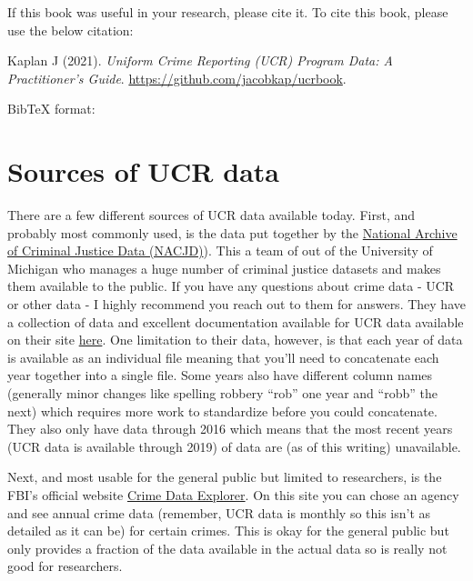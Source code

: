 \documentclass[
  12pt,
  openany]{book}
\begin{document}
If this book was useful in your research, please cite it. To cite this book, please use the below citation:

Kaplan J (2021). \emph{Uniform Crime Reporting (UCR) Program Data: A Practitioner's Guide}. \url{https://github.com/jacobkap/ucrbook}.

BibTeX format:

\hypertarget{sources-of-ucr-data}{%
\section*{Sources of UCR data}\label{sources-of-ucr-data}}


There are a few different sources of UCR data available today. First, and probably most commonly used, is the data put together by the \href{https://www.icpsr.umich.edu/web/pages/NACJD/index.html}{National Archive of Criminal Justice Data (NACJD)}). This a team of out of the University of Michigan who manages a huge number of criminal justice datasets and makes them available to the public. If you have any questions about crime data - UCR or other data - I highly recommend you reach out to them for answers. They have a collection of data and excellent documentation available for UCR data available on their site \href{https://www.icpsr.umich.edu/web/NACJD/series/57}{here}. One limitation to their data, however, is that each year of data is available as an individual file meaning that you'll need to concatenate each year together into a single file. Some years also have different column names (generally minor changes like spelling robbery ``rob'' one year and ``robb'' the next) which requires more work to standardize before you could concatenate. They also only have data through 2016 which means that the most recent years (UCR data is available through 2019) of data are (as of this writing) unavailable.

Next, and most usable for the general public but limited to researchers, is the FBI's official website \href{https://crime-data-explorer.fr.cloud.gov/}{Crime Data Explorer}. On this site you can chose an agency and see annual crime data (remember, UCR data is monthly so this isn't as detailed as it can be) for certain crimes. This is okay for the general public but only provides a fraction of the data available in the actual data so is really not good for researchers.
\end{document}
